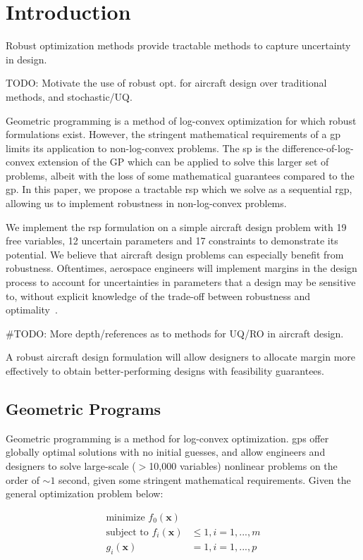 \section{Introduction}
Robust optimization methods provide tractable methods to capture uncertainty in design.

TODO: Motivate the use of robust opt. for aircraft design over traditional methods, and stochastic/UQ.

Geometric programming is a method of log-convex optimization for which robust formulations exist.
However, the stringent mathematical requirements of a \gls{gp} limits its application to non-log-convex problems.
The \gls{sp} is the difference-of-log-convex extension of the \gls{GP} which can be applied to
solve this larger set of problems, albeit with the loss of some mathematical guarantees compared to the \gls{gp}.
In this paper, we propose a tractable \gls{rsp} which we solve as a sequential \gls{rgp},
allowing us to implement robustness in non-log-convex problems.

We implement the \gls{rsp} formulation on a simple aircraft design problem with 19 free variables,
12 uncertain parameters and 17 constraints to demonstrate its potential. We believe that aircraft design
problems can especially benefit from robustness. Oftentimes, aerospace engineers will implement
margins in the design process to account for uncertainties in parameters that a design may be sensitive to,
without explicit knowledge of the trade-off between robustness and optimality~\cite{yao2011}.

#TODO: More depth/references as to methods for UQ/RO in aircraft design.

A robust aircraft design formulation will allow designers to allocate margin more effectively
to obtain better-performing designs with feasibility guarantees.

\subsection{Geometric Programs}

Geometric programming is a method for log-convex optimization.
\gls{gp}s offer globally optimal solutions with no initial guesses,
and allow engineers and designers to solve large-scale ($>$10,000 variables) nonlinear problems
on the order of $\sim1$ second, given some stringent mathematical requirements.
Given the general optimization problem below:

\begin{align}
\label{e:gpform}
\textrm{minimize } f_0(\mathbf{x}) & \nonumber \\
\textrm{subject to } f_i(\mathbf{x}) &\leq 1, i=1,...,m \\
g_i (\mathbf{x}) &= 1, i = 1,...,p \nonumber
\end{align}

